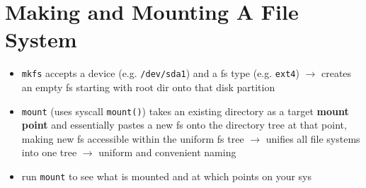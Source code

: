 \section*{Making and Mounting A File System}
\begin{itemize}
\item \texttt{mkfs} accepts a device (e.g. \texttt{/dev/sda1}) and a fs type (e.g. \texttt{ext4}) $\to$ creates an empty fs starting with root dir onto that disk partition
\item \texttt{mount} (uses syscall \texttt{mount()}) takes an existing directory as a target \textbf{mount point} and essentially pastes a new fs onto the directory tree at that point, making new fs accessible within the uniform fs tree $\to$ unifies all file systems into one tree $\to$ uniform and convenient naming
\item run \texttt{mount} to see what is mounted and at which points on your sys
\end{itemize}
